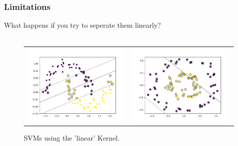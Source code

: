 \documentclass{beamer}
\begin{document}
\begin{frame}{}
	\frametitle{Limitations}
	What happens if you try to seperate them linearly? \\~\\ 
	\begin{figure}[h]
		\begin{tabular}{ll}
			\includegraphics[scale=0.35]{img/linearSVM_moon.png}
			&
			\includegraphics[scale=0.35]{img/linearSVM_circles.png}
		\end{tabular}
		\caption{SVMs using the 'linear' Kernel.}
		\label{Fig:nlinearsvmnonlineardata}
	\end{figure}
\end{frame}
\end{document}
